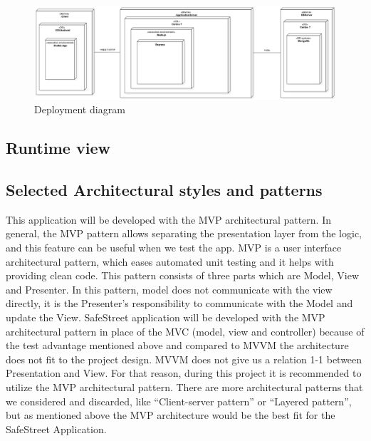 \begin{figure}
\centering
\includegraphics[width=\textwidth]{Images/DeploymentDiagram1.png}
\caption{\label{fig:deploy} Deployment diagram}
\end{figure}



\subsection{Runtime view}

\subsection{Selected Architectural styles and patterns}
This application will be developed with the MVP architectural pattern. In general, the MVP pattern allows separating the presentation layer from the logic, and this feature can be useful when we test the app. MVP is a user interface architectural pattern, which eases automated unit testing and it helps with providing clean code. This pattern consists of three parts which are Model, View and Presenter. In this pattern, model does not communicate with the view directly, it is the Presenter’s responsibility to communicate with the Model and update the View. SafeStreet application will be developed with the MVP architectural pattern in place of the MVC (model, view and controller) because of the test advantage mentioned above and compared to MVVM the architecture does not ﬁt to the project design. MVVM does not give us a relation 1-1 between Presentation and View. For that reason, during this project it is recommended to utilize the MVP architectural pattern. There are more architectural patterns that we considered and discarded, like “Client-server pattern” or “Layered pattern”, but as mentioned above the MVP architecture would be the best ﬁt for the SafeStreet Application.

